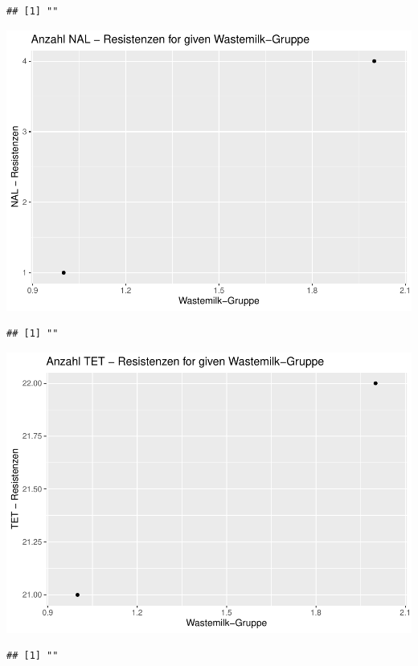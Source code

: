 \documentclass[
]{article}
\begin{document}
\begin{verbatim}
## [1] ""
\end{verbatim}

\includegraphics{NResistenzen_files/figure-latex/binary_or_nominal_variables-7.pdf}

\begin{verbatim}
## [1] ""
\end{verbatim}

\includegraphics{NResistenzen_files/figure-latex/binary_or_nominal_variables-8.pdf}

\begin{verbatim}
## [1] ""
\end{verbatim}
\end{document}
